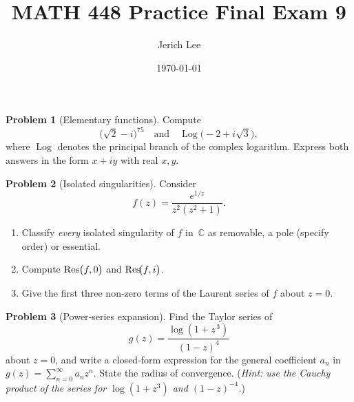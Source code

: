 \documentclass[12pt]{article}
\title{MATH 448 Practice Final Exam 9}
\author{Jerich Lee}
\date{\today}
\DeclareMathOperator{\Log}{Log}
\theoremstyle{definition} %
\newtheorem{problem}{Problem}
\theoremstyle{plain} %
\begin{document}
\maketitle
\pagebreak

  
  \bigskip
  \begin{problem}[Elementary functions]
  Compute
  \[
  \bigl(\sqrt{2}-i\bigr)^{75}
  \quad\text{and}\quad
  \Log\!\bigl(-2+i\sqrt{3}\bigr),
  \]
  where $\Log$ denotes the principal branch of the complex logarithm.
  Express both answers in the form $x+iy$ with real $x,y$.
  \end{problem}
  \pagebreak
  \begin{problem}[Isolated singularities]
  Consider
  \[
  f(z)=\frac{e^{1/z}}{z^{2}(z^{2}+1)}.
  \]
  \begin{enumerate}[label=(\alph*)]
    \item Classify \emph{every} isolated singularity of $f$ in~$\mathbb{C}$
          as removable, a pole (specify order) or essential.
    \item Compute $\Res\bigl(f,0\bigr)$ and
          $\displaystyle \Res\!\bigl(f,i\bigr)$.
    \item Give the first three non‑zero terms of the Laurent series of
          $f$ about $z=0$.
  \end{enumerate}
  \end{problem}
  
  \pagebreak
  \begin{problem}[Power‑series expansion]        %
  Find the Taylor series of
  \[
  g(z)=\frac{\log(1+z^{\,3})}{(1-z)^{4}}
  \]
  about $z=0$, and write a closed‑form expression for the general
  coefficient $a_{n}$ in
  $g(z)=\displaystyle\sum_{n=0}^{\infty}a_{n}z^{n}$.
  State the radius of convergence.
  (\emph{Hint: use the Cauchy product of the series for $\log(1+z^{3})$
  and $(1-z)^{-4}$.})
  \end{problem}
  
\end{document}
